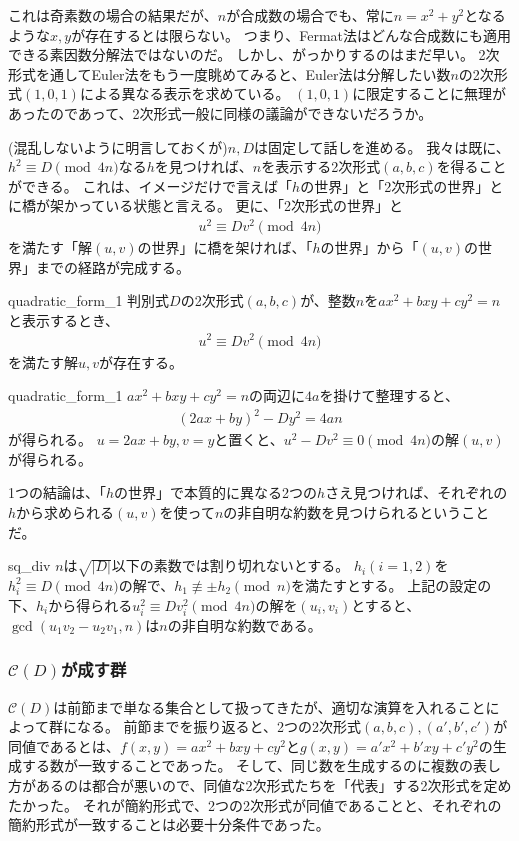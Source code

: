 これは奇素数の場合の結果だが、$n$が合成数の場合でも、常に$n=x^2+y^2$となるような$x,y$が存在するとは限らない。
つまり、Fermat法はどんな合成数にも適用できる素因数分解法ではないのだ。
しかし、がっかりするのはまだ早い。
2次形式を通してEuler法をもう一度眺めてみると、Euler法は分解したい数$n$の2次形式$(1,0,1)$による異なる表示を求めている。
$(1,0,1)$に限定することに無理があったのであって、2次形式一般に同様の議論ができないだろうか。

(混乱しないように明言しておくが)$n,D$は固定して話しを進める。
我々は既に、$h^2\equiv D \pmod{4n}$なる$h$を見つければ、$n$を表示する2次形式$(a,b,c)$を得ることができる。
これは、イメージだけで言えば「$h$の世界」と「2次形式の世界」とに橋が架かっている状態と言える。
更に、「2次形式の世界」と
\begin{align*}
u^2 \equiv Dv^2 \pmod{4n}
\end{align*}
を満たす「解$(u,v)$の世界」に橋を架ければ、「$h$の世界」から「$(u,v)$の世界」までの経路が完成する。

\begin{Prop}{}{quadratic_form_1}
判別式$D$の2次形式$(a,b,c)$が、整数$n$を$ax^2+bxy+cy^2=n$と表示するとき、
\begin{align*}
u^2 \equiv Dv^2 \pmod{4n}
\end{align*}
を満たす解$u,v$が存在する。
\end{Prop}

\begin{prProof}{quadratic_form_1}
$ax^2+bxy+cy^2=n$の両辺に$4a$を掛けて整理すると、
\begin{align*}
(2ax + by)^2 -Dy^2 = 4an
\end{align*}
が得られる。
$u=2ax + by, v=y$と置くと、$u^2 - Dv^2\equiv0\pmod{4n}$の解$(u,v)$が得られる。
\end{prProof}

1つの結論は、「$h$の世界」で本質的に異なる2つの$h$さえ見つければ、それぞれの$h$から求められる$(u,v)$を使って$n$の非自明な約数を見つけられるということだ。

\begin{Prop}{}{sq_div}
$n$は$\sqrt{|D|}$以下の素数では割り切れないとする。
$h_i(i=1,2)$を$h_i^2\equiv D\pmod{4n}$の解で、$h_1\not\equiv\pm h_2\pmod{n}$を満たすとする。
上記の設定の下、$h_i$から得られる$u_i^2 \equiv Dv_i^2 \pmod{4n}$の解を$(u_i,v_i)$とすると、$\gcd(u_1v_2 - u_2v_1, n)$は$n$の非自明な約数である。
\end{Prop}

\subsubsection{$\mathcal{C}(D)$が成す群}
$\mathcal{C}(D)$は前節まで単なる集合として扱ってきたが、適切な演算を入れることによって群になる。
前節までを振り返ると、2つの2次形式$(a,b,c),(a',b',c')$が同値であるとは、$f(x,y)=ax^2+bxy+cy^2$と$g(x,y)=a'x^2+b'xy+c'y^2$の生成する数が一致することであった。
そして、同じ数を生成するのに複数の表し方があるのは都合が悪いので、同値な2次形式たちを「代表」する2次形式を定めたかった。
それが簡約形式で、2つの2次形式が同値であることと、それぞれの簡約形式が一致することは必要十分条件であった。

